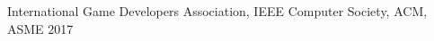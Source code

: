 
\vspace{-.5em}
\begin{cvhonors}

	\cvhonor
	{} %
	{International Game Developers Association,  IEEE Computer Society,  ACM,  ASME} %
	{} %
	{2017} %

\end{cvhonors}